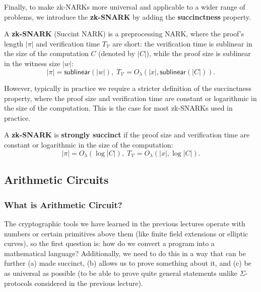 \documentclass[../lecture-notes.tex]{subfiles}
\begin{document}
Finally, to make zk-NARKs more universal and applicable to a wider range of problems, we introduce the \textbf{zk-SNARK} by adding the \textbf{succinctness} property.

\begin{definition}
    A \textbf{zk-SNARK} (Succint NARK) is a preprocessing NARK, where the proof's length $|\pi|$ and verification time $T_{\mathcal{V}}$ are short: the verification time is sublinear in the size of the computation $C$ (denoted by $|C|$), while the proof size is sublinear in the witness size $|w|$:
    \begin{equation*}
        |\pi| = \mathsf{sublinear}(|w|), \; T_{\mathcal{V}} = O_{\lambda}(|x|, \mathsf{sublinear}(|C|)).
    \end{equation*}
\end{definition}

However, typically in practice we require a stricter definition of the succinctness property, where the proof size and verification time are constant or logarithmic in the size of the computation. This is the case for most zk-SNARKs used in practice.
\begin{definition}
    A \textbf{zk-SNARK} is \textbf{strongly succinct} if the proof size and verification time are constant or logarithmic in the size of the computation:
    \begin{equation*}
        |\pi| = O_{\lambda}(\log |C|), \; T_{\mathcal{V}} = O_{\lambda}(|x|, \log|C|).
    \end{equation*}
\end{definition}

\subsection{Arithmetic Circuits}

\subsubsection{What is Arithmetic Circuit?}
The cryptographic tools we have learned in the previous lectures operate with numbers or certain 
primitives above them (like finite field extensions or elliptic curves), so the first question is: how do we convert a program into a mathematical 
language? Additionally, we need to do this in a way that can be further (a) made succinct, (b) allows us to prove 
something about it, and (c) be as universal as possible (to be able to prove quite general statements unlike $\Sigma$-protocols considered in the previous lecture).
\end{document}
